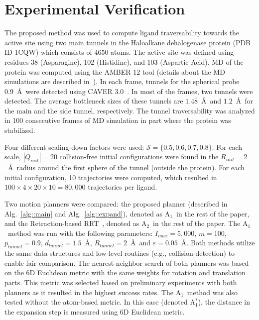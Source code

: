 \documentclass[usletter, 10pt, conference]{ieeeconf} %
\def\dt{d_{tunnel}}
\def\QI{Q_{init}}
\def\RI{R_{init}}
\def\rv{R_{tunnel}}
\def\Imax{I_{max}} %
\def\gb{p_{tunnel}}
\def\S{\mathcal{S}}
\def\RA{A$_{1}$}
\def\RB{A$_{2}$}
\def\RC{A$_{1}^{*}$}
\begin{document}
{\section{Experimental Verification}


The proposed method was used to compute ligand traversability towards the active site using two main tunnels in the Haloalkane dehalogenase protein (PDB ID 1CQW) which consists of 4650 atoms.
The active site was defined using residues 38 (Asparagine), 102 (Histidine), and 103 (Aspartic Acid).
MD of the protein was computed using the AMBER 12 tool (details about the MD simulations are described in~\cite{marques2017catalytic}).
In each frame, tunnels for the spherical probe 0.9~\AA\ were detected using CAVER 3.0~\cite{caver3}. 
In most of the frames, two tunnels were detected.
The average bottleneck sizes of these tunnels are $1.48$~\AA\ and $1.2$~\AA\ for the main and the side tunnel, respectively.
The tunnel traversability was analyzed in 100 consecutive frames of MD simulation in part where the protein was stabilized.

Four different scaling-down factors were used: $\S=\{0.5,0.6,0.7,0.8\}$.
For each scale, $|\QI|=20$ collision-free initial configurations were found in the $\RI=2$~\AA\ radius around the first sphere of the tunnel (outside the protein).
For each initial configuration, 10 trajectories were computed, which resulted
in $100 \times 4 \times 20 \times 10 = 80,000$ trajectories per ligand.

Two motion planners were compared: the proposed planner (described in Alg.~\ref{alg::main} and Alg.~\ref{alg::expand}), denoted as \RA\ in the rest of the paper, and the Retraction-based RRT~\cite{zhangRetraction}, denoted as \RB\ in the rest of the paper.
The \RA\ method was run with the following parameters:
$\Imax=5,000$, $m=100$, $\gb=0.9$, $\dt=1.5$~\AA, $\rv=2$~\AA\ and $\varepsilon=0.05$~\AA.
Both methods utilize the same data structures and low-level routines (e.g., collision-detection) to enable fair comparison.
The nearest-neighbor search of both planners was based on the 6D Euclidean metric with the same weights for rotation and translation parts.
This metric was selected based on preliminary experiments with both planners as it resulted in the highest success rates.
The \RA\ method was also tested without the atom-based metric.
In this case (denoted \RC), the distance in the expansion step is measured using 6D Euclidean metric.

}
\end{document}
